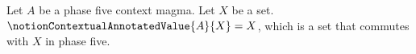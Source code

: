 


\begin{definition}\label{notion_contextual_annotated_value}
    Let $A$ be a phase five context magma.
    Let $X$ be a set.
    $\notionContextualAnnotatedValue{A}{X}=X$, which is a set
        that commutes with $X$ in phase five.
\end{definition}
